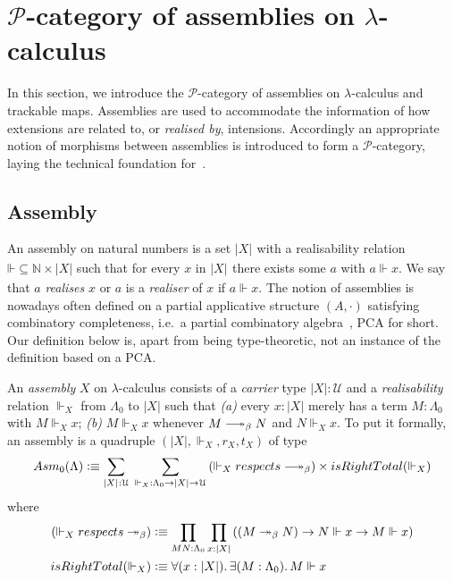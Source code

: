 \documentclass[a4paper,UKenglish,numberwithinsect,cleveref,thm-restate]{lipics-v2021}
\numberwithin{equation}{section}
\newcommand{\tproj}[3][]{\mathopen{}\left|#3\right|_{#2}^{#1}\mathclose{}}
\newcommand{\bproj}[1]{\tproj{}{#1}}
\newcommand{\PP}{\mathscr{P}}
\newcommand{\Asm}{\mathsf{Asm}}
\newcommand{\defeq}{\vcentcolon\equiv}
\newcommand{\Univ}{\mathcal{U}}
\DeclareRobustCommand\longtwoheadrightarrow{\relbar\joinrel\twoheadrightarrow}
\newcommand{\reduce}{\longtwoheadrightarrow_{\beta}}
\theoremstyle{plain}
\begin{document}
\section{\texorpdfstring{$\PP$}{P}-category of assemblies on \texorpdfstring{$\lambda$}{λ}-calculus}\label{sec:assemblies}

In this section, we introduce the $\PP$-category of assemblies on $\lambda$-calculus and trackable maps.
Assemblies are used to accommodate the information of how extensions are related to, or \emph{realised by}, intensions. Accordingly an appropriate notion of morphisms between assemblies is introduced to form a $\PP$-category, laying
the technical foundation for~.


\subsection{Assembly}
An assembly on natural numbers is a set $\bproj{X}$ with a realisability relation $\mathord{\Vdash} \subseteq \mathbb{N} \times |X|$ such that for every $x$ in $\bproj{X}$ there exists some $a$ with $a \Vdash x$.
We say that $a$ \emph{realises} $x$ or $a$ is a \emph{realiser} of $x$ if $a \Vdash x$.
The notion of assemblies is nowadays often defined on a partial applicative structure $(A, \cdot)$ satisfying combinatory completeness, i.e.\ a partial combinatory algebra~\cite{Oosten2008}, PCA for short.
Our definition below is, apart from being type-theoretic, not an instance of the definition based on a PCA.
\begin{definition}\label{def:assembly}
  An \emph{assembly} $X$ on $\lambda$-calculus consists of a \emph{carrier} type $|X| : \Univ$ and a \emph{realisability} relation ${\Vdash_X}$ from $\Lambda_0$ to $|X|$ such that
  \emph{(a)} every $x : |X|$ merely has a term $M : \Lambda_0$ with $M \Vdash_X x$;
  \emph{(b)} $M \Vdash_X x$ whenever $M \reduce N$ and $N \Vdash_X x$.
  To put it formally, an assembly is a quadruple $(|X|, \Vdash_X, r_X, t_X)$ of type
  \[
    \Asm_0(\Lambda) \defeq \sum_{\bproj{X} : {\Univ}}\;\sum_{\mathord{\Vdash_X}:\Lambda_0 \to |X| \to \Univ} 
    \left(\mathord{\Vdash_X}\;\mathsf{respects}\;\mathord{\reduce}\right)
      \times \mathsf{isRightTotal}({\Vdash_X})
  \]
  where
  \begin{align}
    \left(\mathord{\Vdash_X}\;\mathsf{respects}\;\mathord{\twoheadrightarrow_\beta}\right) & \defeq\prod_{M N : \Lambda_0} \prod_{x : |X|} \left( \left(M \twoheadrightarrow_ \beta N\right) \to N \Vdash x \to M \Vdash x \right) \label{def:respect-reduction} \\      
    \mathsf{isRightTotal}(\Vdash_X) & \defeq \forall (x : |X|).\, \exists (M : \Lambda_0).\, M \Vdash x
    \label{def:right-total}
  \end{align}
\end{definition}
\end{document}
